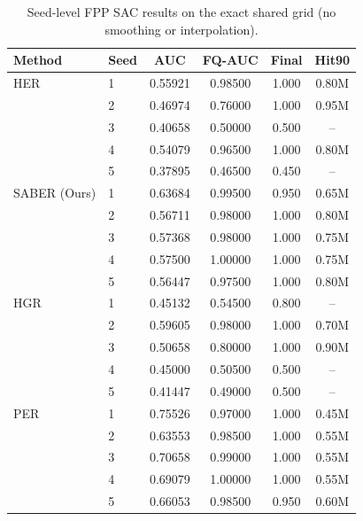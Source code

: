 \begin{table}[t]
\centering
\small
\setlength{\tabcolsep}{1pt}
\begin{tabular}{llcccc}
\toprule
Method & Seed & AUC & FQ-AUC & Final & Hit90 \\
\midrule
HER & 1 & 0.55921 & 0.98500 & 1.000 & 0.80M \\
 & 2 & 0.46974 & 0.76000 & 1.000 & 0.95M \\
 & 3 & 0.40658 & 0.50000 & 0.500 & -- \\
 & 4 & 0.54079 & 0.96500 & 1.000 & 0.80M \\
 & 5 & 0.37895 & 0.46500 & 0.450 & -- \\
\addlinespace[1pt]
SABER (Ours) & 1 & 0.63684 & 0.99500 & 0.950 & 0.65M \\
 & 2 & 0.56711 & 0.98000 & 1.000 & 0.80M \\
 & 3 & 0.57368 & 0.98000 & 1.000 & 0.75M \\
 & 4 & 0.57500 & 1.00000 & 1.000 & 0.75M \\
 & 5 & 0.56447 & 0.97500 & 1.000 & 0.80M \\
\addlinespace[1pt]
HGR & 1 & 0.45132 & 0.54500 & 0.800 & -- \\
 & 2 & 0.59605 & 0.98000 & 1.000 & 0.70M \\
 & 3 & 0.50658 & 0.80000 & 1.000 & 0.90M \\
 & 4 & 0.45000 & 0.50500 & 0.500 & -- \\
 & 5 & 0.41447 & 0.49000 & 0.500 & -- \\
\addlinespace[1pt]
PER & 1 & 0.75526 & 0.97000 & 1.000 & 0.45M \\
 & 2 & 0.63553 & 0.98500 & 1.000 & 0.55M \\
 & 3 & 0.70658 & 0.99000 & 1.000 & 0.55M \\
 & 4 & 0.69079 & 1.00000 & 1.000 & 0.55M \\
 & 5 & 0.66053 & 0.98500 & 0.950 & 0.60M \\
\bottomrule
\end{tabular}
\caption{Seed-level FPP SAC results on the exact shared grid (no smoothing or interpolation).}
\label{tab:supp-seeds-fpp-sac}
\end{table}
